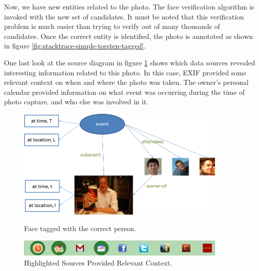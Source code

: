 Now, we have new entities related to the photo. The face verification algorithm is invoked with the new set of candidates. It must be noted that this verification problem is much easier than trying to verify out of many thousands of candidates. Once the correct entity is identified, the photo is annotated as shown in figure \ref{fig:stacktrace-simple-torsten-tagged}.

One last look at the source diagram in figure \ref{fig:stacktrace-simple-all} shows which data sources revealed interesting information related to this photo. In this case, EXIF provided some relevant context on when and where the photo was taken. The owner's personal calendar provided information on what event was occurring during the time of photo capture, and who else was involved in it.


\begin{figure}[h!]
\begin{minipage}[b]{0.9\linewidth}
\centering
\includegraphics[width=0.9\textwidth]{media/chapter4/stacktrace/torsten-tagged.png}
\caption{Face tagged with the correct person.}
\label{fig:stacktrace-simple-torsten-tagged}
\end{minipage}
\hspace{0.5cm}
\begin{minipage}[b]{0.9\linewidth}
\centering
\includegraphics[width=0.9\textwidth]{media/chapter4/stacktrace/time-space-calendar-selected.png}
\caption{Highlighted Sources Provided Relevant Context.}
\label{fig:stacktrace-simple-all}
\end{minipage}
\end{figure}





